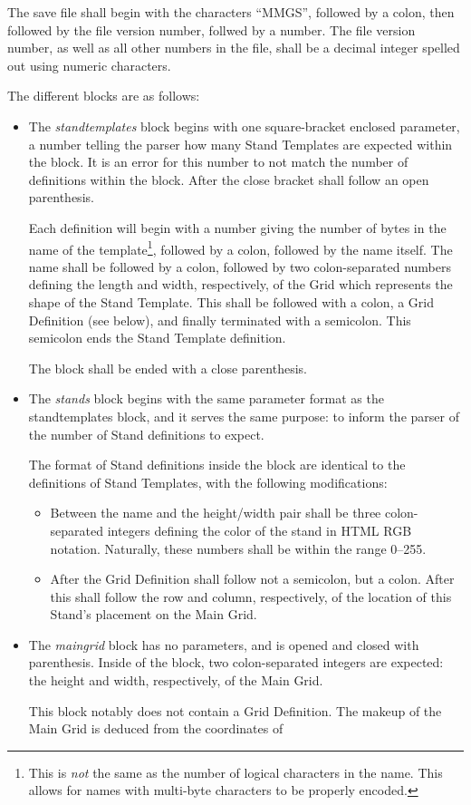 \documentclass{report}
\begin{document}
The save file shall begin with the characters ``MMGS'', followed by a colon,
then followed by the file version number, follwed by a number. The
file version number, as well as all other numbers in the file, shall be a
decimal integer spelled out using numeric characters.

The different blocks are as follows:
\begin{itemize}
	\item The \emph{standtemplates} block begins with one square-bracket
		enclosed parameter, a number telling the parser how many
		Stand Templates are expected within the block. It is an error
		for this number to not match the number of definitions within
		the block. After the close bracket shall follow an open
		parenthesis.

		Each definition will begin with a number giving the number of
		bytes in the name of the template\footnote{This is \emph{not}
			the same as the number of logical characters in the
			name. This allows for names with multi-byte characters
		to be properly encoded.}, followed by a colon,
		followed by the name itself. The name shall be followed by
		a colon, followed by two colon-separated numbers defining
		the length and width, respectively, of the Grid which
		represents the shape of the Stand Template. This shall be
		followed with a colon, a Grid Definition (see below), and
		finally terminated with a semicolon. This semicolon ends
		the Stand Template definition.

		The block shall be ended with a close parenthesis.
	\item The \emph{stands} block begins with the same parameter format as
		the standtemplates block, and it serves the same purpose:
		to inform the parser of the number of Stand definitions to
		expect.

		The format of Stand definitions inside the block are
		identical to the definitions of Stand Templates, with the
		following modifications:
		\begin{itemize}
			\item Between the name and the height/width pair
				shall be three colon-separated integers
				defining the color of the stand in
				HTML RGB notation. Naturally, these
				numbers shall be within the range 0--255.
			\item After the Grid Definition shall follow not a
				semicolon, but a colon. After this shall
				follow the row and column, respectively, of
				the location of this Stand's placement
				on the Main Grid.
		\end{itemize}
	\item The \emph{maingrid} block has no parameters, and is opened
		and closed with parenthesis. Inside of the
		block, two colon-separated integers are expected: the
		height and width, respectively, of the Main Grid.

		This block notably does not contain a Grid Definition. The
		makeup of the Main Grid is deduced from the coordinates of
\end{itemize}
\end{document}
